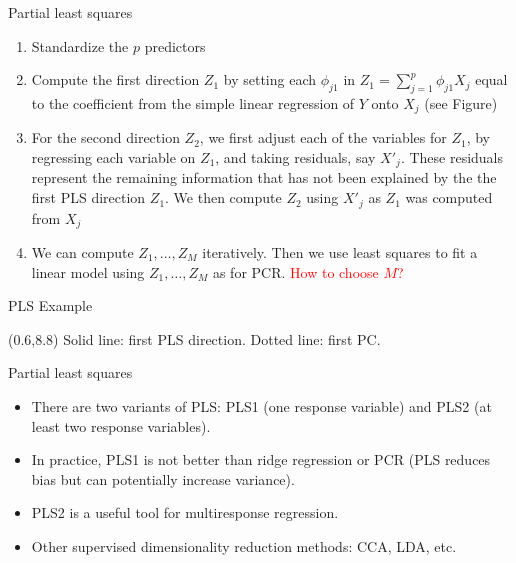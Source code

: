 \documentclass[14pt]{beamer}
\begin{document}
\begin{frame}{Partial least squares}\small

\begin{enumerate}
	\item Standardize the $p$ predictors
	\item Compute the first direction $Z_1$ by setting each $\phi_{j1}$ in $Z_1 = \sum_{j = 1}^p \phi_{j1} X_j$ equal to the coefficient from the simple linear regression of $Y$ onto $X_j$ (see Figure)
	\item For the second direction $Z_2$, we first adjust each of the variables for $Z_1$, by regressing each variable on $Z_1$, and taking residuals, say $X'_j$. These residuals represent the remaining information that has not been explained by the the first PLS direction $Z_1$. We then compute $Z_2$ using $X'_j$ as $Z_1$ was computed from $X_j$
	\item We can compute $Z_1, \dots, Z_M$ iteratively. Then we use least squares to fit a linear model using $Z_1, \dots, Z_M$ as for PCR. \textcolor{red}{How to choose $M$?}
\end{enumerate}

\end{frame}

\begin{frame}{PLS Example}


\begin{textblock}{12}(0.6,8.8)
\textcolor[RGB]{0,159,134}{Solid line: first PLS direction.}\qquad 
\textcolor[RGB]{0,159,134}{Dotted line: first PC.}
\end{textblock}
\end{frame}


\begin{frame}{Partial least squares}

\begin{itemize}
\item There are two variants of PLS: PLS1 (one response variable) and PLS2 (at least two response variables).
\item In practice, PLS1 is not better than ridge regression or PCR (PLS reduces bias but can potentially increase variance).
\item PLS2 is a useful tool for multiresponse regression.
\item Other supervised dimensionality reduction methods: CCA, LDA, etc.
\end{itemize}

\end{frame}
\end{document}
